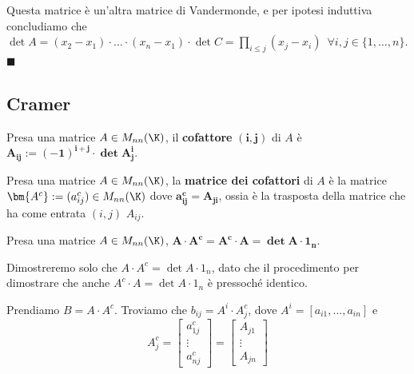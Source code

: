 \documentclass[11pt, a4paper, titlepage, oneside]{scrbook}
\begin{document}
Questa matrice è un'altra matrice di Vandermonde, e per ipotesi induttiva concludiamo che \mbox{$\det A = (x_2 - x_1) \cdot \ldots \cdot (x_n - x_1) \cdot \det C = \prod_{i \leq j} (x_j - x_i) \enspace \forall i,j \in \{1, \ldots, n\}$}. $\blacksquare$


\subsection{Cramer}

\begin{Definizione}[Cofattore]
\label{def-cofattore}
Presa una matrice $A \in M_{nn}(\K)$, il \textbf{cofattore} $\bm{(i,j)}$ di $A$ è $\bm{A_{ij} := (-1)^{i+j} \cdot \det A_j^i}$.
\end{Definizione}

\begin{Definizione}
\label{def-matrice dei cofattori}
Presa una matrice $A \in M_{nn}(\K)$, la \textbf{matrice dei cofattori} di $A$ è la matrice \mbox{$\bm{A^c} := (a_{ij}^c) \in M_{nn}(\K)$} dove $\bm{a_{ij}^c = A_{ji}}$, ossia è la trasposta della matrice che ha come entrata $(i,j)$ $A_{ij}$. 
\end{Definizione}

\begin{Proposizione}
\label{Formula-di-Cramer}
Presa una matrice $A \in M_{nn}(\K)$, $\bm{A \cdot A^c = A^c \cdot A = \det A \cdot 1_n}$. 
\end{Proposizione}

\Dimostrazione \nopagebreak

Dimostreremo solo che $A \cdot A^c = \det A \cdot 1_n$, dato che il procedimento per dimostrare che anche $A^c \cdot A = \det A \cdot 1_n$ è pressoché identico.

Prendiamo $B = A \cdot A^c$. Troviamo che $b_{ij} = A^i \cdot A^c_j$, dove $A^i =[a_{i1}, \ldots, a_{in}]$ e 
\[
A^c_j = \begin{bmatrix}
    a_{1j}^c \\
    \vdots \\
    a_{nj}^c
\end{bmatrix} =  \begin{bmatrix}
    A_{j1} \\
    \vdots \\
    A_{jn}
\end{bmatrix}
\]
\end{document}
